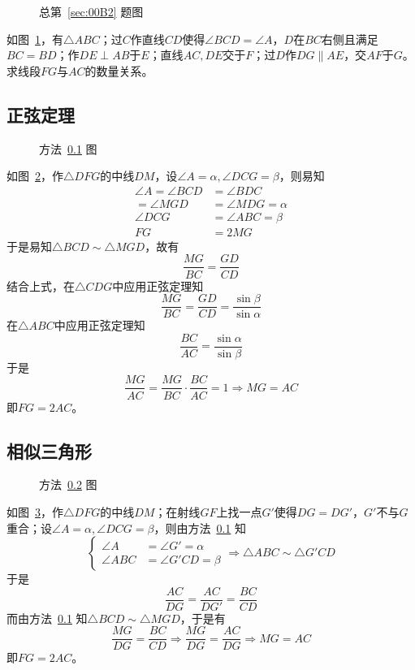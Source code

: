 

\begin{figure}[htbp]
  \centering {}
  \caption{总第~\ref{sec:00B2} 题图} \label{fig:00B2}
\end{figure}

如图~\ref{fig:00B2}，有$\triangle ABC$；过$C$作直线$CD$使得$\angle BCD = \angle A$，$D$在$BC$右侧且满足$BC = BD$；作$DE \perp AB$于$E$；直线$AC, DE$交于$F$；过$D$作$DG \parallel AE$，交$AF$于$G$。求线段$FG$与$AC$的数量关系。


\subsection{正弦定理} \label{subsec:00B2-sin}

\begin{figure}[htbp]
  \centering {}
  \caption{方法~\ref{subsec:00B2-sin} 图} \label{fig:00B2-sin}
\end{figure}

如图~\ref{fig:00B2-sin}，作$\triangle DFG$的中线$DM$，设$\angle A = \alpha, \angle DCG = \beta$，则易知
\begin{align*}
  \angle A = \angle BCD &= \angle BDC \\
  = \angle MGD &= \angle MDG = \alpha \\
  \angle DCG &= \angle ABC = \beta \\
  FG &= 2MG
\end{align*}
于是易知$\triangle BCD \sim \triangle MGD$，故有
\[ \frac{MG}{BC} = \frac{GD}{CD} \]
结合上式，在$\triangle CDG$中应用正弦定理知
\[ \frac{MG}{BC} = \frac{GD}{CD} = \frac{\sin\beta}{\sin\alpha} \]
在$\triangle ABC$中应用正弦定理知
\[ \frac{BC}{AC} = \frac{\sin\alpha}{\sin\beta} \]
于是
\[ \frac{MG}{AC} = \frac{MG}{BC}\cdot\frac{BC}{AC} = 1 \Rightarrow MG = AC \]
即$FG = 2AC$。

\subsection{相似三角形} \label{subsec:00B2-sim}

\begin{figure}[htbp]
  \centering {}
  \caption{方法~\ref{subsec:00B2-sim} 图} \label{fig:00B2-sim}
\end{figure}

如图~\ref{fig:00B2-sim}，作$\triangle DFG$的中线$DM$；在射线$GF$上找一点$G'$使得$DG = DG'$，$G'$不与$G$重合；设$\angle A = \alpha, \angle DCG = \beta$，则由方法~\ref{subsec:00B2-sin} 知
\[ \left\{ \begin{aligned}
  \angle A &= \angle G' = \alpha \\
  \angle ABC &= \angle G'CD = \beta
\end{aligned} \right. \Rightarrow \triangle ABC \sim \triangle G'CD \]
于是
\[ \frac{AC}{DG} = \frac{AC}{DG'} = \frac{BC}{CD} \]
而由方法~\ref{subsec:00B2-sin} 知$\triangle BCD \sim \triangle MGD$，于是有
\[ \frac{MG}{DG} = \frac{BC}{CD} \Rightarrow \frac{MG}{DG} = \frac{AC}{DG} \Rightarrow MG = AC \]
即$FG = 2AC$。
